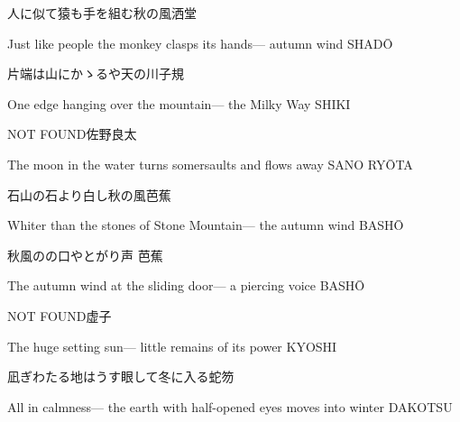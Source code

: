 \begin{haiku}
    {\FH 人に似て猿も手を組む秋の風}\hfill{\FH 洒堂}

    \vin{} Just like people
    \vin{} \vin{} the monkey clasps its hands---
    \vin{} \vin{} \vin{} autumn wind \hspace{\fill} SHAD\={O}
\end{haiku}

\begin{haiku}
    {\FH 片端は山にかゝるや天の川}\hfill{\FH 子規}

    \vin{} One edge
    \vin{} \vin{} hanging over the mountain---
    \vin{} \vin{} \vin{} the Milky Way \hspace{\fill} SHIKI
\end{haiku}

\begin{haiku}
    NOT FOUND\hfill{\FH 佐野良太}

    \vin{} The moon in the water
    \vin{} \vin{} turns somersaults
    \vin{} \vin{} \vin{} and flows away \hspace{\fill} SANO RY\={O}TA
\end{haiku}

\begin{haiku}
    {\FH 石山の石より白し秋の風}\hfill{\FH 芭蕉}

    \vin{} Whiter than
    \vin{} \vin{} the stones of Stone Mountain---
    \vin{} \vin{} \vin{} the autumn wind \hspace{\fill} BASH\={O}
\end{haiku}

\begin{haiku}
    {\FH 秋風のの口やとがり声 }\hfill{\FH 芭蕉}

    \vin{} The autumn wind
    \vin{} \vin{} at the sliding door---
    \vin{} \vin{} \vin{} a piercing voice \hspace{\fill} BASH\={O}
\end{haiku}

\begin{haiku}
    NOT FOUND\hfill{\FH 虚子}

    \vin{} The huge setting sun---
    \vin{} \vin{} little remains of
    \vin{} \vin{} \vin{} its power \hspace{\fill} KYOSHI
\end{haiku}

\begin{haiku}
    {\FH 凪ぎわたる地はうす眼して冬に入る}\hfill{\FH 蛇笏}

    \vin{} All in calmness---
    \vin{} \vin{} the earth with half-opened eyes
    \vin{} \vin{} \vin{} moves into winter \hspace{\fill} DAKOTSU
\end{haiku}

